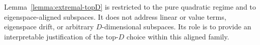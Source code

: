 \documentclass[10pt]{article}
\theoremstyle{plain}
\theoremstyle{remark}
\begin{document}
Lemma~\ref{lemma:extremal-topD} is restricted to the pure quadratic regime and to eigenspace-aligned subspaces.
It does not address linear or value terms, eigenspace drift, or arbitrary $D$-dimensional subspaces.
Its role is to provide an interpretable justification of the top-$D$ choice within this aligned family.




\end{document}
